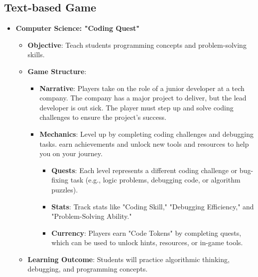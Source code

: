 \subsection{Text-based Game}
\begin{itemize}
    \item \textbf{Computer Science: "Coding Quest"}
    \begin{itemize}
        \item \textbf{Objective}: Teach students programming concepts and problem-solving skills.
        \item \textbf{Game Structure}:
        \begin{itemize}
            \item \textbf{Narrative}: Players take on the role of a junior developer at a tech company. The company has a major project to deliver, but the lead developer is out sick. The player must step up and solve coding challenges to ensure the project’s success.
            \item \textbf{Mechanics}: Level up by completing coding challenges and debugging tasks. earn achievements and unlock new tools and resources to help you on your journey.
            \begin{itemize}
                \item \textbf{Quests}: Each level represents a different coding challenge or bug-fixing task (e.g., logic problems, debugging code, or algorithm puzzles).
                \item \textbf{Stats}: Track stats like "Coding Skill," "Debugging Efficiency," and "Problem-Solving Ability."
                \item \textbf{Currency}: Players earn "Code Tokens" by completing quests, which can be used to unlock hints, resources, or in-game tools.
            \end{itemize}
        \end{itemize}
        \item \textbf{Learning Outcome}: Students will practice algorithmic thinking, debugging, and programming concepts.
    \end{itemize}


\end{itemize}
